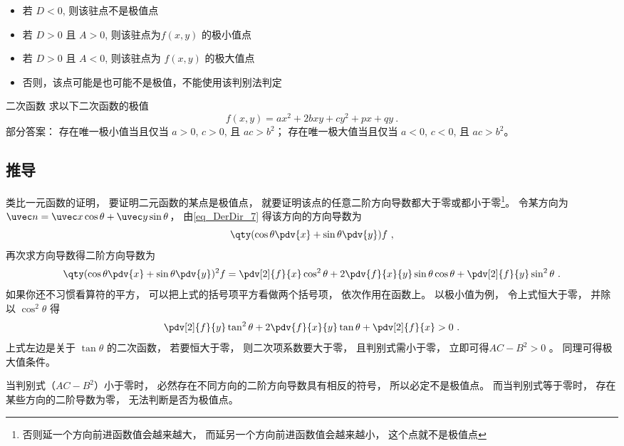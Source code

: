 \begin{itemize}
\item 若 $D<0$, 则该驻点不是极值点
\item 若 $D>0$ 且 $A>0$, 则该驻点为$f(x,y)$ 的极小值点
\item 若 $D>0$ 且 $A<0$, 则该驻点为 $f(x,y)$ 的极大值点
\item 否则，该点可能是也可能不是极值，不能使用该判别法判定
\end{itemize}

\begin{exercise}{二次函数}
求以下二次函数的极值
\begin{equation}
f(x, y) = ax^2 + 2bxy + cy^2 + px + qy~.
\end{equation}
部分答案： 存在唯一极小值当且仅当 $a>0$, $c>0$, 且 $ac>b^2$； 存在唯一极大值当且仅当 $a<0$, $c<0$, 且 $ac>b^2$。
\end{exercise}

\subsection{推导}

类比一元函数的证明， 要证明二元函数的某点是极值点， 就要证明该点的任意二阶方向导数都大于零或都小于零\footnote{否则延一个方向前进函数值会越来越大， 而延另一个方向前进函数值会越来越小， 这个点就不是极值点}。 令某方向为 $\uvec n = \uvec x \cos\theta + \uvec y \sin\theta$， 由\autoref{eq_DerDir_7}  得该方向的方向导数为
\begin{equation}
\qty(\cos\theta\pdv{x} + \sin\theta\pdv{y}) f~,
\end{equation}
再次求方向导数得二阶方向导数为
\begin{equation}
\qty(\cos\theta\pdv{x} + \sin\theta\pdv{y})^2 f
= \pdv[2]{f}{x} \cos^2\theta + 2\pdv{f}{x}{y} \sin\theta\cos\theta + \pdv[2]{f}{y} \sin^2\theta~.
\end{equation}
如果你还不习惯看算符的平方， 可以把上式的括号项平方看做两个括号项， 依次作用在函数上。 以极小值为例， 令上式恒大于零， 并除以 $\cos^2\theta$ 得
\begin{equation}
\pdv[2]{f}{y} \tan^2\theta + 2\pdv{f}{x}{y} \tan\theta + \pdv[2]{f}{x} > 0~.
\end{equation}
上式左边是关于 $\tan\theta$ 的二次函数， 若要恒大于零， 则二次项系数要大于零， 且判别式需小于零， 立即可得$AC-B^2>0$ 。 同理可得极大值条件。

当判别式（$AC-B^2$）小于零时， 必然存在不同方向的二阶方向导数具有相反的符号， 所以必定不是极值点。 而当判别式等于零时， 存在某些方向的二阶导数为零， 无法判断是否为极值点。

